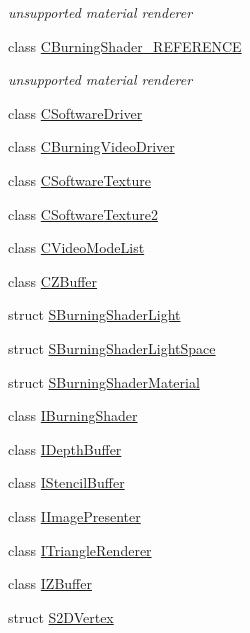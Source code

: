 \begin{DoxyCompactItemize}
\begin{DoxyCompactList}\small\item\em unsupported material renderer \end{DoxyCompactList}\item 
class \hyperlink{classirr_1_1video_1_1_c_burning_shader___r_e_f_e_r_e_n_c_e}{C\-Burning\-Shader\-\_\-\-R\-E\-F\-E\-R\-E\-N\-C\-E}
\begin{DoxyCompactList}\small\item\em unsupported material renderer \end{DoxyCompactList}\item 
class \hyperlink{classirr_1_1video_1_1_c_software_driver}{C\-Software\-Driver}
\item 
class \hyperlink{classirr_1_1video_1_1_c_burning_video_driver}{C\-Burning\-Video\-Driver}
\item 
class \hyperlink{classirr_1_1video_1_1_c_software_texture}{C\-Software\-Texture}
\item 
class \hyperlink{classirr_1_1video_1_1_c_software_texture2}{C\-Software\-Texture2}
\item 
class \hyperlink{classirr_1_1video_1_1_c_video_mode_list}{C\-Video\-Mode\-List}
\item 
class \hyperlink{classirr_1_1video_1_1_c_z_buffer}{C\-Z\-Buffer}
\item 
struct \hyperlink{structirr_1_1video_1_1_s_burning_shader_light}{S\-Burning\-Shader\-Light}
\item 
struct \hyperlink{structirr_1_1video_1_1_s_burning_shader_light_space}{S\-Burning\-Shader\-Light\-Space}
\item 
struct \hyperlink{structirr_1_1video_1_1_s_burning_shader_material}{S\-Burning\-Shader\-Material}
\item 
class \hyperlink{classirr_1_1video_1_1_i_burning_shader}{I\-Burning\-Shader}
\item 
class \hyperlink{classirr_1_1video_1_1_i_depth_buffer}{I\-Depth\-Buffer}
\item 
class \hyperlink{classirr_1_1video_1_1_i_stencil_buffer}{I\-Stencil\-Buffer}
\item 
class \hyperlink{classirr_1_1video_1_1_i_image_presenter}{I\-Image\-Presenter}
\item 
class \hyperlink{classirr_1_1video_1_1_i_triangle_renderer}{I\-Triangle\-Renderer}
\item 
class \hyperlink{classirr_1_1video_1_1_i_z_buffer}{I\-Z\-Buffer}
\item 
struct \hyperlink{structirr_1_1video_1_1_s2_d_vertex}{S2\-D\-Vertex}

\end{DoxyCompactItemize}
